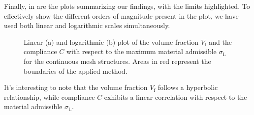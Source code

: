 Finally, in  are the plots summarizing our findings, with the limits highlighted. To effectively show the different orders of magnitude present in the plot, we have used both linear and logarithmic scales simultaneously.
\begin{figure}
    \hspace*{\fill}
    \hfill
    \hspace*{\fill}
    \caption{Linear (a) and logarithmic (b) plot of the volume fraction $V_\text{f}$ and the compliance $C$ with respect to the maximum material admissible $\sigma_\text{L}$ for the continuous mesh structures. Areas in red represent the boundaries of the applied method.}
    \label{fig:03_to_plot}
\end{figure}
It's interesting to note that the volume fraction $V_\text{f}$ follows a hyperbolic relationship, while compliance $C$ exhibits a linear correlation with respect to the material admissible $\sigma_\text{L}$.


